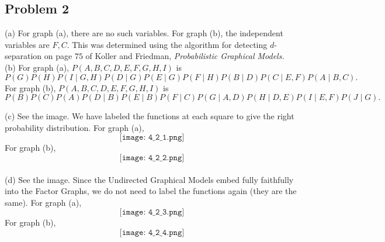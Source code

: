 \documentclass[12pt]{article}
\theoremstyle{remark}
\begin{document}
\subsection*{Problem 2} (a) For graph (a), there are no such variables. For graph (b), the independent variables are $F,C$. This was determined using the algorithm for detecting $d$-separation on page $75$ of Koller and Friedman, \textit{Probabilistic Graphical Models.} \\

\noindent (b) For graph (a), $P(A,B,C,D,E,F,G,H,I)$ is 
\[
P(G) P(H) P(I \mid G,H) P(D \mid G) P(E \mid G) P(F \mid H) P(B \mid D) P(C \mid E,F) P(A \mid B,C).
\]
For graph (b), $P(A,B,C,D,E,F,G,H,I)$ is
\[
P(B) P(C) P(A) P(D \mid B) P(E \mid B) P(F \mid C) P(G \mid A,D) P(H \mid D,E) P(I \mid E,F) P(J \mid G).
\]

\noindent (c) See the image. We have labeled the functions at each square to give the right probability distribution. For graph (a),
\[
\texttt{[image: 4\_2\_1.png]}
\]
For graph (b),
\[
\texttt{[image: 4\_2\_2.png]}
\]
\\

\noindent (d) See the image. Since the Undirected Graphical Models embed fully faithfully into the Factor Graphs, we do not need to label the functions again (they are the same). For graph (a),
\[
\texttt{[image: 4\_2\_3.png]}
\]
For graph (b),
\[
\texttt{[image: 4\_2\_4.png]}
\]
\end{document}
